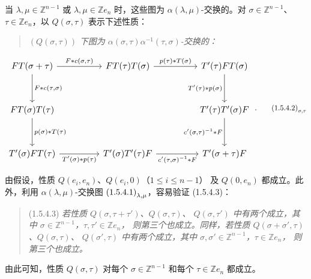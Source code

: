 \clearpage
{}%
当 $\lambda,\mu\in\mathbb Z^{n-1}$ 或
$\lambda,\mu\in\mathbb Z e_n$ 时，这些图为
$\alpha(\lambda,\mu)$-交换的。对
$\sigma\in\mathbb Z^{n-1}$、$\tau\in\mathbb Z e_n$，以
$Q(\sigma,\tau)$ 表示下述性质：

\begin{quote}
  \noindent\textup{$(Q(\sigma,\tau))$}\quad
  \emph{下图为
  $\alpha(\sigma,\tau)\alpha^{-1}(\tau,\sigma)$-交换的：}
\end{quote}

\begin{equation}
  \resizebox{0.98\textwidth}{!}{%
    $\begin{tikzcd}[ampersand replacement=\&,column sep=4.5em,row sep=3.2em]
      FT(\sigma+\tau)
        \arrow[r,"{F*c(\sigma,\tau)}"]
        \arrow[d,"{F*c(\tau,\sigma)}"]
        \& FT(\tau)T(\sigma)
        \arrow[r,"{p(\tau)*T(\sigma)}"]
        \& T'(\tau)FT(\sigma)
        \arrow[d,"{T'(\tau)*p(\sigma)}"'] \\
      FT(\sigma)T(\tau)
        \arrow[d,"{p(\sigma)*T(\tau)}"]
        \& {}
        \& T'(\tau)T'(\sigma)F
        \arrow[d,"{c'(\sigma,\tau)^{-1}*F}"'] \\
      T'(\sigma)FT(\tau)
        \arrow[r,"{T'(\sigma)*p(\tau)}"']
        \& T'(\sigma)T'(\tau)F
        \arrow[r,"{c'(\tau,\sigma)^{-1}*F}"']
        \& T'(\sigma+\tau)F
    \end{tikzcd}$%
  }\;.
  \tag*{\(\textup{(1.5.4.2)}_{\sigma,\tau}\)}
\end{equation}

由假设，性质 $Q(e_i,e_n)$、$Q(e_i,0)$（$1\leq i\leq n-1$）
及 $Q(0,e_n)$ 都成立。此外，利用
$\alpha(\lambda,\mu)$-交换图
$\textup{(1.5.4.1)}_{\lambda,\mu}$，容易验证 (1.5.4.3)：

\begin{quote}
  \noindent\textup{(1.5.4.3)}\quad
  \emph{若性质 $Q(\sigma,\tau+\tau')$、$Q(\sigma,\tau)$、
  $Q(\sigma,\tau')$ 中有两个成立，其中
  $\sigma\in\mathbb Z^{n-1}$，$\tau,\tau'\in\mathbb Z e_n$，
  则第三个也成立。同样，若性质
  $Q(\sigma+\sigma',\tau)$、$Q(\sigma,\tau)$、
  $Q(\sigma',\tau)$ 中有两个成立，其中
  $\sigma,\sigma'\in\mathbb Z^{n-1}$，$\tau\in\mathbb Z e_n$，
  则第三个也成立。}
\end{quote}

由此可知，性质 $Q(\sigma,\tau)$ 对每个
$\sigma\in\mathbb Z^{n-1}$ 和每个 $\tau\in\mathbb Z e_n$ 都成立。

